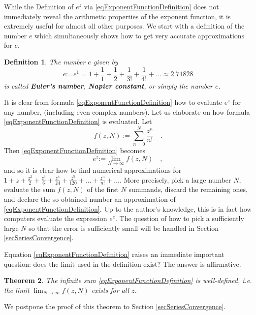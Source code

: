\documentclass[12pt]{book}
\newcommand{\eqdef}{\textbf{:=}}
\newtheorem{theorem}{Theorem}[section]
\newtheorem{definition}[theorem]{Definition}
\renewcommand{\emph}{\textbf}
\begin{document}
While the Definition of $e^z$ via \eqref{eqExponentFunctionDefinition} does not immediately reveal the arithmetic properties of the exponent function, it is extremely useful for almost all other purposes. We start with a definition of the number $e$ which simultaneously shows how to get very accurate approximations for $e$.
\begin{definition}\label{defE}
The number $e$ given by
\[
e\eqdef e^1= 1+ \frac{1}{1} +\frac{1}2 +\frac{1}{3!} +\frac{1}{4!}+\dots \approx 2.71828
\]
is called \emph{Euler's number}, \emph{Napier constant}, or simply the number $e$.
\end{definition}
It is clear from formula \eqref{eqExponentFunctionDefinition} how to evaluate $e^z$ for any number, (including even complex numbers). Let us elaborate on how formula \eqref{eqExponentFunctionDefinition} is evaluated. Let 
\[
\displaystyle f(z,N):=\sum\limits_{n=0}^{N} \frac{z^n}{n!}\quad .
\]
Then \eqref{eqExponentFunctionDefinition} becomes 
\[
e^z\eqdef \displaystyle\lim\limits_{N\to \infty} f(z, N)\quad ,
\]
and so it is clear how to find numerical approximations for $1+z+\frac{z^{2}}{2} +\frac{z^3}{6}+\frac{z^4}{24}+\frac{z^5}{120}+\dots+\frac{z^n}{n!}+\dots$. More precisely, pick a large number $N$, evaluate the sum $f(z,N)$ of the first $N$ summands, discard the remaining ones, and declare the so obtained number an approximation of \eqref{eqExponentFunctionDefinition}. Up to the author's knowledge, this is in fact how computers evaluate the expression $e^z$. The question of how to pick a sufficiently large $N$ so that the error is sufficiently small will be handled in Section \ref{secSeriesConvergence}. 

Equation \eqref{eqExponentFunctionDefinition} raises an immediate important question: does the limit used in the definition exist? The answer is affirmative.
\begin{theorem} The infinite sum \eqref{eqExponentFunctionDefinition} is well-defined, i.e. the limit $\displaystyle\lim_{N\to \infty} f(z, N)$ exists for all $z$.
\end{theorem}
We postpone the proof of this theorem to Section \ref{secSeriesConvergence}. 
\end{document}
